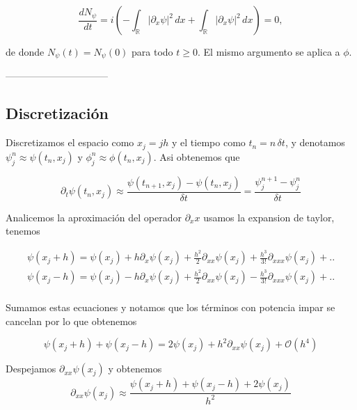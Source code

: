 \documentclass[letterpaper,11pt]{exam}
\theoremstyle{plain}
\begin{document}
\begin{equation*}
    \frac{dN_\psi}{dt} = i\left(
    -\int_{\mathbb{R}}|\partial_x\psi|^2\,dx + 
    \int_{\mathbb{R}}|\partial_x\psi|^2\,dx\right) = 0,
\end{equation*}

\hspace{2mm}


de donde $N_\psi(t) = N_\psi(0)$ para todo $t \geq 0$. El mismo 
argumento se aplica a $\phi$.

\hspace{2mm}

--------------------------------

\subsection{Discretización}

Discretizamos el espacio como $x_j = jh$ y el tiempo como 
$t_n = n\,\delta t$, y denotamos $\psi_j^n \approx \psi(t_n,x_j)$ 
y $\phi_j^n \approx \phi(t_n,x_j)$. Asi obtenemos que 

\begin{equation*}
    \partial_t\psi(t_n,x_j)\approx \frac{\psi(t_{n+1},x_j)-\psi(t_{n},x_j)}{\delta t} = \frac{\psi_j^{n+1}-\psi_j^n}{\delta t}
\end{equation*}


Analicemos la aproximación del operador $\partial_xx$ usamos la expansion de taylor, tenemos 

\begin{align*}
    \psi(x_j+h)=\psi(x_j)+ h\partial_x \psi(x_j)+\frac{h^2}{2}\partial_{xx}\psi(x_j)+ \frac{h^3}{3!}\partial_{xxx}\psi(x_j)+..\\
     \psi(x_j-h)=\psi(x_j)-h\partial_x \psi(x_j)+\frac{h^2}{2}\partial_{xx}\psi(x_j)- \frac{h^3}{3!}\partial_{xxx}\psi(x_j)+..\\
\end{align*}

Sumamos estas ecuaciones y notamos que los términos con potencia impar se cancelan por lo que obtenemos

\begin{equation*}
    \psi(x_j+h)+ \psi(x_j-h)=2\psi(x_j)+h^2\partial_{xx}\psi(x_j)+ \mathcal{O}(h^4)
\end{equation*}

Despejamos $\partial_{xx}\psi(x_j)$ y obtenemos 
\begin{equation*}
    \partial_{xx}\psi(x_j)\approx\frac{\psi(x_j+h)+\psi(x_j-h)+2\psi(x_j)}{h^2}
\end{equation*}
\end{document}

